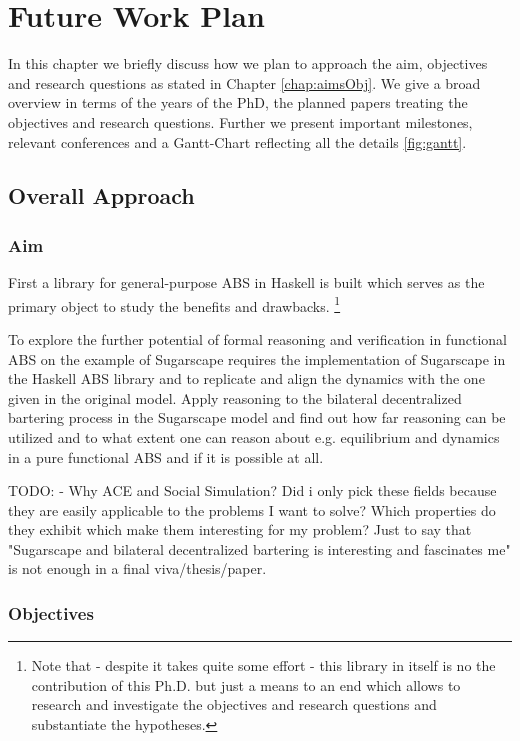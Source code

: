 \chapter{Future Work Plan}
\label{chap:future}

In this chapter we briefly discuss how we plan to approach the aim, objectives and research questions as stated in Chapter \ref{chap:aimsObj}. We give a broad overview in terms of the years of the PhD, the planned papers treating the objectives and research questions. Further we present important milestones, relevant conferences and a Gantt-Chart reflecting all the details \ref{fig:gantt}.

\section{Overall Approach}

\subsection{Aim}
First a library for general-purpose ABS in Haskell is built which serves as the primary object to study the benefits and drawbacks. \footnote{Note that - despite it takes quite some effort - this library in itself is no the contribution of this Ph.D. but just a means to an end which allows to research and investigate the objectives and research questions and substantiate the hypotheses.}

To explore the further potential of formal reasoning and verification in functional ABS on the example of Sugarscape requires the implementation of Sugarscape in the Haskell ABS library and to replicate and align the dynamics with the one given in the original model. Apply reasoning to the bilateral decentralized bartering process in the Sugarscape model and find out how far reasoning can be utilized and to what extent one can reason about e.g. equilibrium and dynamics in a pure functional ABS and if it is possible at all.

TODO:
- Why ACE and Social Simulation? Did i only pick these fields because they are easily applicable to the problems I want to solve? Which properties do they exhibit which make them interesting for my problem? Just to say that "Sugarscape and bilateral decentralized bartering is interesting and fascinates me" is not enough in a final viva/thesis/paper.	
\\

\subsection{Objectives}


